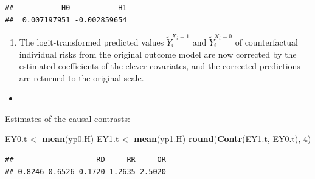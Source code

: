 \documentclass[
]{book}
\newenvironment{Shaded}{\begin{snugshade}}{\end{snugshade}}
\newcommand{\DecValTok}[1]{\textcolor[rgb]{0.00,0.00,0.81}{#1}}
\newcommand{\FunctionTok}[1]{\textcolor[rgb]{0.13,0.29,0.53}{\textbf{#1}}}
\newcommand{\NormalTok}[1]{#1}
\newcommand{\OtherTok}[1]{\textcolor[rgb]{0.56,0.35,0.01}{#1}}
\newcommand{\SpecialCharTok}[1]{\textcolor[rgb]{0.81,0.36,0.00}{\textbf{#1}}}
\providecommand{\tightlist}{%
  \setlength{\itemsep}{0pt}\setlength{\parskip}{0pt}}
\begin{document}
\begin{verbatim}
##           H0           H1 
##  0.007197951 -0.002859654
\end{verbatim}

\begin{enumerate}
\def\labelenumi{\arabic{enumi}.}
\setcounter{enumi}{2}
\tightlist
\item
  The logit-transformed predicted values \(\widetilde{Y}_i^{X_i=1}\) and
  \(\widetilde{Y}_i^{X_i=0}\)
  of counterfactual individual risks from the original outcome model are
  now corrected by the estimated coefficients of the clever covariates,
  and the corrected predictions are returned to the original scale.
\end{enumerate}

\begin{Shaded}
\end{Shaded}

\begin{itemize}
\tightlist
\item
\end{itemize}

Estimates of the causal contrasts:

\begin{Shaded}
\begin{Highlighting}[]
\NormalTok{EY0.t }\OtherTok{\textless{}{-}} \FunctionTok{mean}\NormalTok{(yp0.H)}
\NormalTok{EY1.t }\OtherTok{\textless{}{-}} \FunctionTok{mean}\NormalTok{(yp1.H)}
\FunctionTok{round}\NormalTok{(}\FunctionTok{Contr}\NormalTok{(EY1.t, EY0.t), }\DecValTok{4}\NormalTok{)}
\end{Highlighting}
\end{Shaded}

\begin{verbatim}
##                   RD     RR     OR 
## 0.8246 0.6526 0.1720 1.2635 2.5020
\end{verbatim}
\end{document}
